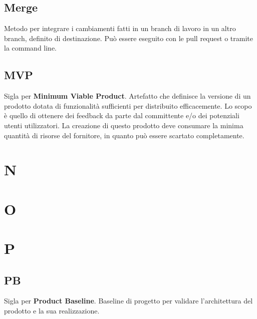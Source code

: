\documentclass[a4paper,12pt]{article}
\begin{document}
\subsection{Merge}
Metodo per integrare i cambiamenti fatti in un branch di lavoro in un altro branch, definito di destinazione. Può essere eseguito con le pull request o tramite la command line.

\subsection*{MVP}
Sigla per \textbf{Minimum Viable Product}. Artefatto che definisce la versione di un prodotto dotata di funzionalità sufficienti per distribuito efficacemente.
Lo scopo è quello di ottenere dei feedback da parte dal committente e/o dei potenziali utenti utilizzatori.
La creazione di questo prodotto deve consumare la minima quantità di risorse del fornitore, in quanto può essere scartato completamente.

\clearpage

\section{N}

\section{O}

\section{P}

\subsection{PB}
Sigla per \textbf{Product Baseline}. Baseline di progetto per validare l'architettura del prodotto e la sua realizzazione.
\end{document}
